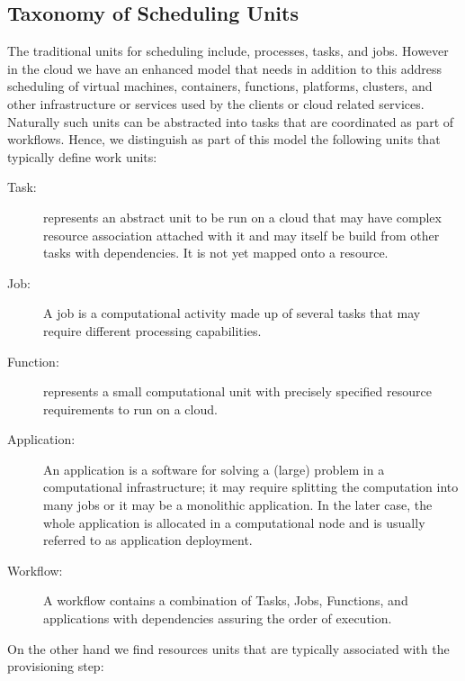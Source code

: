 \documentclass[final,5p,times,twocolumn]{elsarticle}
\begin{document}
\subsection{Taxonomy of Scheduling Units}

The traditional units for scheduling include, processes, tasks, and
jobs. However in the cloud we have an enhanced model that needs in
addition to this address scheduling of virtual machines, containers,
functions, platforms, clusters, and other infrastructure or services
used by the clients or cloud related services. Naturally such units
can be abstracted into tasks that are coordinated as part of
workflows. Hence, we distinguish as part of this model the following
units that typically define work units:

\begin{description}

\item[Task:] represents an abstract unit to be run on a cloud that may
  have complex resource association attached with it and may itself be
  build from other tasks with dependencies. It is not yet mapped onto
  a resource.

\item[Job:] A job is a computational activity made up of several tasks
  that may require different processing capabilities.

\item[Function:] represents a small computational unit with precisely
  specified resource requirements to run on a cloud.

\item[Application:] An application is a software for solving a (large)
  problem in a computational infrastructure; it may require splitting
  the computation into many jobs or it may be a monolithic
  application. In the later case, the whole application is allocated
  in a computational node and is usually referred to as application
  deployment.

\item[Workflow:] A workflow contains a combination of Tasks, Jobs,
Functions, and applications with dependencies assuring the order of
execution.

\end{description}

On the other hand we find resources units that are typically
associated with the provisioning step:
\end{document}
